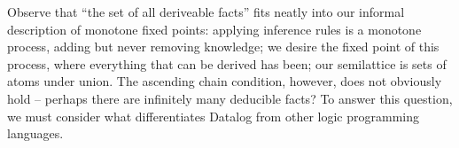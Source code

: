 
Observe that ``the set of all deriveable facts'' fits neatly into our informal
description of monotone fixed points: applying inference rules is a monotone
process, adding but never removing knowledge; we desire the fixed point of this
process, where everything that can be derived has been; our semilattice is sets
of atoms under union. The ascending chain condition, however, does not obviously
hold -- perhaps there are infinitely many deducible facts? To answer this
question, we must consider what differentiates Datalog from other logic
programming languages.







